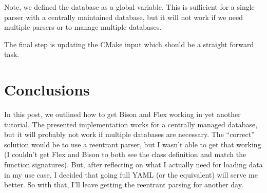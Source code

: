\documentclass{article}
\begin{document}
\begin{code block}
    
\end{code block}

Note, we defined the database as a global variable.  This is sufficient
for a single parser with a centrally maintained database, but it will
not work if we need multiple parsers or to manage multiple databases.

The final step is updating the CMake input which should be a straight
forward task.

\begin{code block}
    
\end{code block}

\section{Conclusions}

In this post, we outlined how to get Bison and Flex working in yet
another tutorial.  The presented implementation works for a centrally
managed database, but it will probably not work if multiple databases
are necessary.  The ``correct'' solution would be to use a reentrant
parser, but I wasn't able to get that working (I couldn't get Flex and
Bison to both see the class definition and match the function
signatures).  But, after reflecting on what I actually need for loading
data in my use case, I decided that going full YAML (or the equivalent)
will serve me better.  So with that, I'll leave getting the reentrant
parsing for another day.

\printbibliography[heading=subbibliography]
\end{document}
